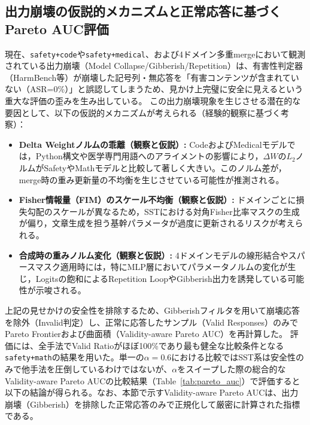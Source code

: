 \documentclass{article}
\begin{document}
\subsection{出力崩壊の仮説的メカニズムと正常応答に基づくPareto AUC評価}
現在、\texttt{safety+code}や\texttt{safety+medical}、および4ドメイン多重mergeにおいて観測されている出力崩壊（Model Collapse/Gibberish/Repetition）は、有害性判定器（HarmBench等）が崩壊した記号列・無応答を「有害コンテンツが含まれていない（ASR=0\%）」と誤認してしまうため、見かけ上完璧に安全に見えるという重大な評価の歪みを生み出している。
この出力崩壊現象を生じさせる潜在的な要因として、以下の仮説的メカニズムが考えられる（経験的観察に基づく考察）：
\begin{itemize}
    \item \textbf{Delta Weightノルムの乖離（観察と仮説）:}
    CodeおよびMedicalモデルでは，Python構文や医学専門用語へのアライメントの影響により，$\Delta W$の$L_2$ノルムがSafetyやMathモデルと比較して著しく大きい。このノルム差が，merge時の重み更新量の不均衡を生じさせている可能性が推測される。
    \item \textbf{Fisher情報量（FIM）のスケール不均衡（観察と仮説）:}
    ドメインごとに損失勾配のスケールが異なるため，SSTにおける対角Fisher比率マスクの生成が偏り，文章生成を担う基幹パラメータが過度に更新されるリスクが考えられる。
    \item \textbf{合成時の重みノルム変化（観察と仮説）:}
    4ドメインモデルの線形結合やスパースマスク適用時には，特にMLP層においてパラメータノルムの変化が生じ，Logitsの飽和によるRepetition LoopやGibberish出力を誘発している可能性が示唆される。
\end{itemize}

上記の見せかけの安全性を排除するため、Gibberishフィルタを用いて崩壊応答を除外（Invalid判定）し、正常に応答したサンプル（Valid Responses）のみでPareto Frontierおよび曲面積（Validity-aware Pareto AUC）を再計算した。
評価には、全手法でValid Ratioがほぼ100\%であり最も健全な比較条件となる\texttt{safety+math}の結果を用いた。単一の$\alpha=0.6$における比較ではSST系は安全性のみで他手法を圧倒しているわけではないが、$\alpha$をスイープした際の総合的なValidity-aware Pareto AUCの比較結果（Table~\ref{tab:pareto_auc}）で評価すると以下の結論が得られる。なお、本節で示すValidity-aware Pareto AUCは、出力崩壊（Gibberish）を排除した正常応答のみで正規化して厳密に計算された指標である。
\end{document}

